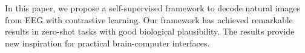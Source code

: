\label{sec:conclusion}
In this paper, we propose a self-supervised framework to decode natural images from EEG with contrastive learning.
Our framework has achieved remarkable results in zero-shot tasks with good biological plausibility.
The results provide new inspiration for practical brain-computer interfaces.